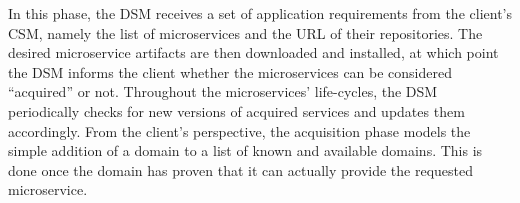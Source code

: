 
In this phase, the DSM receives a set of application requirements from the client's CSM, namely the list of microservices and the URL of their repositories. The desired microservice artifacts are then downloaded and installed, at which point the DSM informs the client whether the microservices can be considered ``acquired'' or not. 
Throughout the microservices' life-cycles, the DSM periodically checks for new versions of acquired services and updates them accordingly. 
From the client's perspective, the acquisition phase models the simple addition of a domain to a list of known and available domains. This is done once the domain has proven that it can actually provide the requested microservice. 





